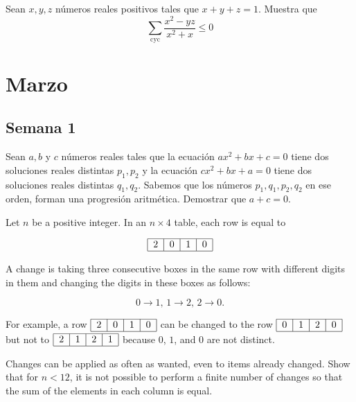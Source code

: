 \documentclass[11pt]{scrartcl}
\begin{document}
\begin{problem} 
    Sean $x,y,z$ números reales positivos tales que $x+y+z=1$. Muestra que
    \[\sum_{\text{cyc}}\frac{x^2-yz}{x^2+x} \leq 0\]
\end{problem}

\newpage
\section{Marzo}

\subsection{Semana 1}
\begin{problemax} %
    Sean $ a,b$ y $ c$ números reales tales que la ecuación $ax^2 + bx  + c = 0$ tiene dos soluciones reales distintas $ p_1,p_2$ y la ecuación $ cx^2 + bx + a = 0$ tiene dos soluciones reales distintas $ q_1,q_2$. Sabemos que los números $ p_1,q_1,p_2,q_2$ en ese orden, forman una progresión aritmética. Demostrar que $ a+c=0$.
\end{problemax}


\begin{problemax} %
    Let $n$ be a positive integer. In an $n\times4$ table, each row is equal to

\[\begin{tabular}{| c | c | c | c |}
\hline
2 & 0 & 1 & 0 \\
\hline
\end{tabular}\]

A change is taking three consecutive boxes in the same row with different digits in them and changing the digits in these boxes as follows:

\[0\to1\text{, }1\to2\text{, }2\to0\text{.}\]

For example, a row $\begin{tabular}{| c | c | c | c |}\hline 2 & 0 & 1 & 0 \\ \hline\end{tabular}$ can be changed to the row $\begin{tabular}{| c | c | c | c |}\hline 0 & 1 & 2 & 0 \\ \hline\end{tabular}$ but not to $\begin{tabular}{| c | c | c | c |}\hline 2 & 1 & 2 & 1 \\ \hline\end{tabular}$ because $0$, $1$, and $0$ are not distinct.

Changes can be applied as often as wanted, even to items already changed. Show that for $n<12$, it is not possible to perform a finite number of changes so that the sum of the elements in each column is equal.
\end{problemax}
\end{document}

